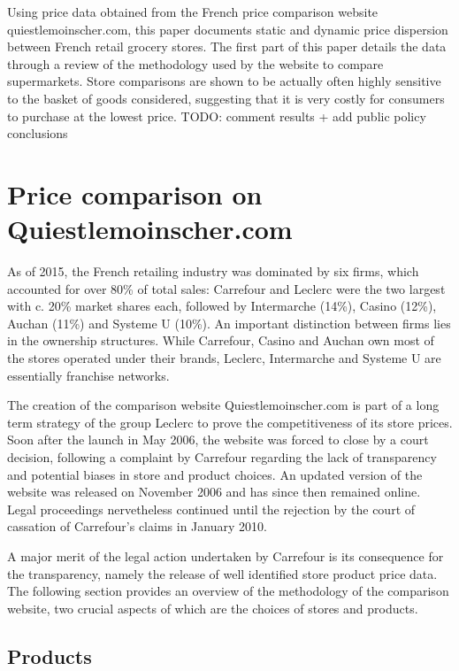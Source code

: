 \documentclass[english]{article}
\begin{document}
Using price data obtained from the French price comparison website quiestlemoinscher.com, this paper documents static and dynamic price dispersion between French retail grocery stores. The first part of this paper details the data through a review of the methodology used by the website to compare supermarkets. Store comparisons are shown to be actually often highly sensitive to the basket of goods considered, suggesting that it is very costly for consumers to purchase at the lowest price. TODO: comment results + add public policy conclusions

\section{Price comparison on Quiestlemoinscher.com}

As of 2015, the French retailing industry was dominated by six firms, which accounted for over 80\% of total sales: Carrefour and Leclerc were the two largest with c. 20\% market shares each, followed by Intermarche (14\%), Casino (12\%), Auchan (11\%) and Systeme U (10\%). An important distinction between firms lies in the ownership structures. While Carrefour, Casino and Auchan own most of the stores operated under their brands, Leclerc, Intermarche and Systeme U are essentially franchise networks.

The creation of the comparison website Quiestlemoinscher.com is part of a long term strategy of the group Leclerc to prove the competitiveness of its store prices. Soon after the launch in May 2006, the website was forced to close by a court decision, following a complaint by Carrefour regarding the lack of transparency and potential biases in store and product choices. An updated version of the website was released on November 2006 and has since then remained online. Legal proceedings nervetheless continued until the rejection by the court of cassation of Carrefour's claims in January 2010.

A major merit of the legal action undertaken by Carrefour is its consequence for the transparency, namely the release of well identified store product price data. The following section provides an overview of the methodology of the comparison website, two crucial aspects of which are the choices of stores and products.

\subsection{Products}
\end{document}
